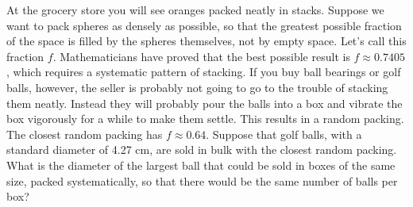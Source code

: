 At the grocery store you will see oranges packed neatly in stacks.
Suppose we want to pack spheres as densely as possible, so that the greatest
possible fraction of the space is filled by the spheres themselves, not
by empty space. Let's call this fraction $f$.
Mathematicians have proved that the best possible result is $f\approx 0.7405$,
which requires a systematic pattern of stacking. If you buy ball bearings or golf
balls, however, the seller is probably not going to go to the trouble of stacking
them neatly. Instead they will probably pour the balls into a box and vibrate the
box vigorously for a while to make them settle. This results in a random packing.
The closest random packing has $f\approx 0.64$.
Suppose that golf balls, with a standard diameter of 4.27 cm, are sold in bulk
with the closest random packing. What is the diameter of the largest ball that
could be sold in boxes of the same size, packed systematically, so that there
would be the same number of balls per box?\answercheck
